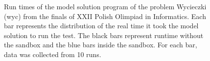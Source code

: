 \documentclass[en]{pracamgr}
\begin{document}
\begin{appendices}
\begin{figure}[H]
\caption{Run times of the model solution program of the problem Wycieczki (wyc) from the finals of XXII Polish Olimpiad in Informatics. Each bar represents the distribution of the real time it took the model solution to run the test. The black bars represent runtime without the sandbox and the blue bars inside the sandbox. For each bar, data was collected from 10 runs.}
\label{figure:wyc_model_solution_real_time}
\end{figure}


\end{appendices}
\end{document}
